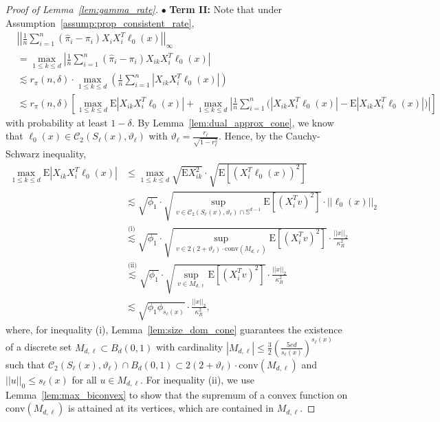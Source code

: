\documentclass[ejsv2,noshowframe]{imsart}
\theoremstyle{plain}
\theoremstyle{definition}
\theoremstyle{remark}
\newcommand{\norm}[1]{\left|\left| #1 \right|\right|}
\renewcommand{\hat}{\widehat}
\begin{document}
\begin{proof}[Proof of Lemma~\ref{lem:gamma_rate}]
	$\bullet$ \textbf{Term II:} Note that under Assumption~\ref{assump:prop_consistent_rate},
	\begin{align*}
		&\norm{\frac{1}{n}\sum_{i=1}^n \left(\hat{\pi}_i - \pi_i\right) X_i X_i^T \ell_0(x)}_{\infty} \\
		&= \max_{1\leq k \leq d} \left|\frac{1}{n}\sum_{i=1}^n \left(\hat{\pi}_i -\pi_i\right)X_{ik}X_i^T\ell_0(x) \right|\\
		&\lesssim r_{\pi}(n,\delta) \cdot \max_{1\leq k \leq d} \left(\frac{1}{n}\sum_{i=1}^n \left|X_{ik} X_i^T\ell_0(x) \right| \right)\\
		&\lesssim r_{\pi}(n,\delta) \left[\max_{1\leq k \leq d} \mathrm{E}\left|X_{ik}X_i^T\ell_0(x)\right| + \max_{1\leq k \leq d}\left|\frac{1}{n}\sum_{i=1}^n \Big(\left|X_{ik} X_i^T\ell_0(x) \right| -\mathrm{E}\left|X_{ik} X_i^T\ell_0(x) \right| \Big) \right|\right]
	\end{align*}
	with probability at least $1-\delta$. By Lemma~\ref{lem:dual_approx_cone}, we know that $\ell_0(x)\in \mathcal{C}_2(S_{\ell}(x),\vartheta_{\ell})$ with $\vartheta_{\ell}=\frac{r_{\ell}}{\sqrt{1-r_{\ell}^2}}$. Hence, by the Cauchy-Schwarz inequality,
	\begin{align*}
		\max_{1\leq k \leq d} \mathrm{E}\left|X_{ik}X_i^T\ell_0(x)\right| &\leq \max_{1\leq k \leq d} \sqrt{\mathrm{E} X_{ik}^2} \cdot \sqrt{\mathrm{E}\left[(X_i^T\ell_0(x))^2\right]} \\
		&\lesssim \sqrt{\phi_1} \cdot \sqrt{\sup_{v \in \mathcal{C}_2(S_{\ell}(x),\vartheta_{\ell})\cap \mathbb{S}^{d-1}} \mathrm{E}\left[(X_i^Tv)^2\right]} \cdot\norm{\ell_0(x)}_2\\
		&\stackrel{\text{(i)}}{\lesssim}\sqrt{\phi_1} \cdot \sqrt{\sup_{v \in 2(2+\vartheta_{\ell})\cdot \mathrm{conv}(M_{d,\ell})} \mathrm{E}\left[(X_i^Tv)^2\right]} \cdot \frac{\norm{x}_2}{\kappa_R^2}\\
		&\stackrel{\text{(ii)}}{\lesssim} \sqrt{\phi_1} \cdot \sqrt{\sup_{v \in M_{d,\ell}} \mathrm{E}\left[(X_i^Tv)^2\right]} \cdot \frac{\norm{x}_2}{\kappa_R^2}\\
		&\lesssim \sqrt{\phi_1 \phi_{s_{\ell}(x)}} \cdot \frac{\norm{x}_2}{\kappa_R^2},
	\end{align*}
	where, for inequality (i), Lemma~\ref{lem:size_dom_cone} guarantees the existence of a discrete set $M_{d,\ell} \subset B_d(0,1)$ with cardinality $|M_{d,\ell}| \leq \frac{3}{2} \left(\frac{5ed}{s_{\ell}(x)} \right)^{s_{\ell}(x)}$ such that $\mathcal{C}_2(S_{\ell}(x),\vartheta_{\ell}) \cap B_d(0,1) \subset 2(2+\vartheta_{\ell}) \cdot \mathrm{conv}(M_{d,\ell})$ and $\norm{u}_0 \leq s_{\ell}(x)$ for all $u\in M_{d,\ell}$. For inequality (ii), we use Lemma~\ref{lem:max_biconvex} to show that the supremum of a convex function on $\mathrm{conv}(M_{d,\ell})$ is attained at its vertices, which are contained in $M_{d,\ell}$.
	

\end{proof}
\end{document}
